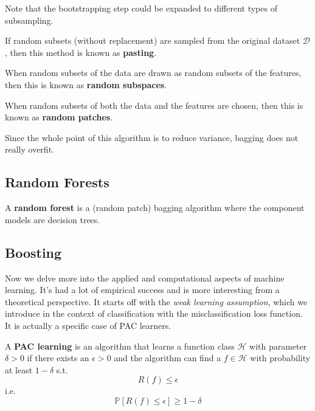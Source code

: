 \documentclass{article}
\begin{document}
    Note that the bootstrapping step could be expanded to different types of subsampling. 

    \begin{definition}[Pasting]
      If random subsets (without replacement) are sampled from the original dataset $\mathcal{D}$, then this method is known as \textbf{pasting}. 
    \end{definition}

    \begin{definition}
      When random subsets of the data are drawn as random subsets of the features, then this is known as \textbf{random subspaces}. 
    \end{definition}

    \begin{definition}
      When random subsets of both the data and the features are chosen, then this is known as \textbf{random patches}. 
    \end{definition}

    Since the whole point of this algorithm is to reduce variance, bagging does not really overfit. 

    \subsection{Random Forests}

      \begin{definition}
        A \textbf{random forest} is a (random patch) bagging algorithm where the component models are decision trees.  
      \end{definition}

  \subsection{Boosting} 

        Now we delve more into the applied and computational aspects of machine learning. It's had a lot of empirical success and is more interesting from a theoretical perspective. It starts off with the \textit{weak learning assumption}, which we introduce in the context of classification with the misclassification loss function. It is actually a specific case of PAC learners. 

        \begin{definition}
          A \textbf{PAC learning} is an algorithm that learns a function class $\mathcal{H}$ with parameter $\delta > 0$ if there exists an $\epsilon > 0$ and the algorithm can find a $f \in \mathcal{H}$ with probability at least $1 - \delta$ s.t.
          \begin{equation}
            R(f) \leq \epsilon 
          \end{equation}
          i.e. 
          \begin{equation}
            \mathbb{P}[ R(f) \leq \epsilon] \geq 1 - \delta
          \end{equation}
        \end{definition}
\end{document}
